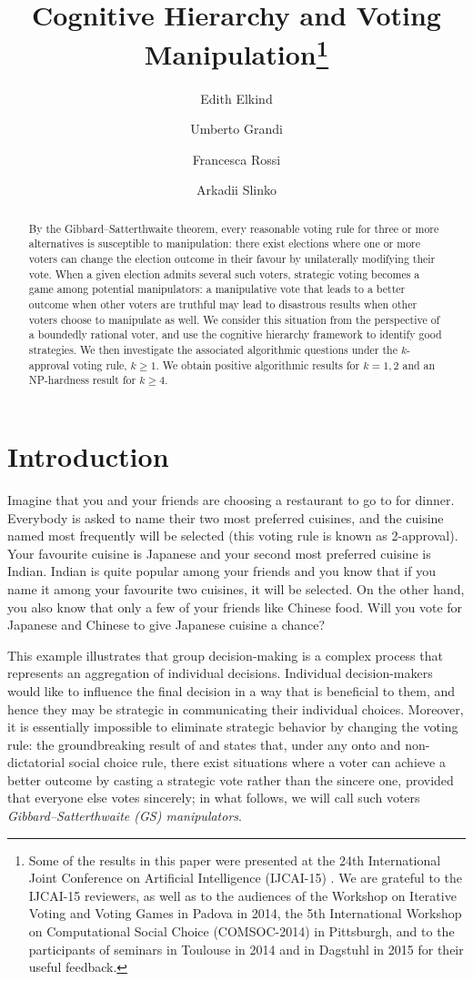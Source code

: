 \documentclass[11pt]{article}
\title{\bf Cognitive Hierarchy and Voting Manipulation\thanks{Some of the results in this paper 
were presented at the 24th International Joint Conference on Artificial Intelligence (IJCAI-15) 
\citep{ElkindEtAlIJCAI2015}. We are grateful to the IJCAI-15 reviewers, 
as well as to the audiences of the Workshop on
Iterative Voting and Voting Games in Padova in 2014, 
the 5th International Workshop on Computational Social Choice (COMSOC-2014) in Pittsburgh, 
and to the participants of seminars in Toulouse in 2014 and in Dagstuhl in 2015 
for their useful feedback.}}
\author{Edith Elkind}
\affil{University of Oxford, elkind@cs.ox.ac.uk}
\author{Umberto Grandi}
\affil{University of Toulouse, umberto.grandi@irit.fr}
\author{Francesca Rossi}
\affil{University of Padova, frossi@math.unipd.it}
\author{Arkadii Slinko}
\affil{The University of Auckland, a.slinko@auckland.ac.nz}
\begin{document}
\maketitle

\begin{abstract}
\noindent
By the Gibbard--Satterthwaite theorem, every reasonable voting rule for three or more alternatives
is susceptible to manipulation: there exist elections where one or more voters can change the election
outcome in their favour by unilaterally modifying their vote.
When a given election admits several such voters, strategic voting becomes
a game among potential manipulators: a manipulative vote that leads to a better outcome
when other voters are truthful may lead to disastrous results when other voters
choose to manipulate as well. We consider this situation from the perspective of a boundedly rational voter, 
and use the cognitive hierarchy framework \citep{camerer2004cognitive} to identify good strategies.
We then investigate the associated algorithmic questions
under the $k$-approval voting rule, $k\ge 1$. We obtain positive algorithmic results
for $k=1, 2$ and an NP-hardness result for $k\ge 4$.
\end{abstract}



\section{Introduction}\label{sec:intro}
Imagine that you and your friends are choosing a restaurant to go to for dinner.
Everybody is asked to name their two most preferred cuisines, 
and the cuisine named most frequently will be selected (this voting rule is known as 2-approval). 
Your favourite cuisine is Japanese and your second most preferred cuisine is Indian.
Indian is quite popular among your friends and you know that if you name it among your favourite two cuisines, it
will be selected. On the other hand, you also know that only a few of your friends like Chinese food.
Will you vote for Japanese and Chinese to give Japanese cuisine a chance?

This example illustrates that group decision-making is a complex process that represents an
aggregation of individual decisions. Individual decision-makers would like to influence the final decision in a
way that is beneficial to them, and hence they may be strategic in communicating their individual choices.
Moreover, it is essentially impossible to eliminate strategic behavior by changing the voting rule:
the groundbreaking result of \citet{gib:j:gs} and \citet{sat:j:gs} states that, under any 
onto and non-dictatorial social choice rule, there exist situations where a voter can achieve a better outcome by 
casting a strategic vote rather than the sincere one, provided that everyone else votes sincerely;
in what follows, we will call such voters {\em Gibbard--Satterthwaite (GS) manipulators}. 
\end{document}
